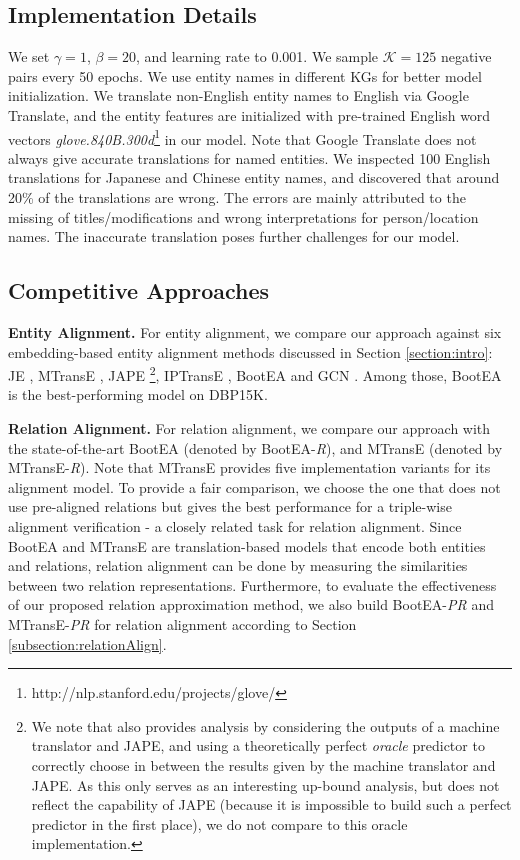 \documentclass[11pt,a4paper]{article}
\newcommand\cparagraph[1]{\vspace{1mm}\noindent\textbf{#1.}}
\begin{document}
\subsection{Implementation Details}
\label{implementation} We set $\gamma = 1$, $\beta = 20$, and learning rate to 0.001. We sample $\mathcal{K}=125$ negative pairs every 50
epochs.
We use entity names in different KGs for better model initialization. We translate non-English entity names to English via Google Translate, and the entity features are initialized with pre-trained English word vectors
\emph{glove.840B.300d}\footnote{http://nlp.stanford.edu/projects/glove/} in our model.
Note that Google Translate does not always give accurate translations for named entities. We inspected 100 English translations for Japanese and
Chinese entity names, and discovered that around 20\% of the translations are wrong. The errors are mainly attributed to the missing of
titles/modifications and wrong interpretations for person/location names. The inaccurate translation poses further challenges for our model.


\subsection{Competitive Approaches}

\cparagraph{Entity Alignment}
For entity alignment, we compare our approach against six embedding-based entity alignment methods discussed in
Section \ref{section:intro}: JE \cite{hao2016joint}, MTransE \cite{chen2016multilingual}, JAPE \cite{sun2017cross}\footnote{We note
	that \cite{sun2017cross} also provides analysis by considering the outputs of a machine translator and JAPE, and using a theoretically
	perfect \emph{oracle} predictor to correctly choose in between the results given by the machine translator and JAPE. As this only
	serves as an interesting up-bound analysis, but does not reflect the capability of JAPE (because it is impossible to build such a perfect predictor in the first place),
	we do not compare to this oracle implementation. },
IPTransE \cite{zhu2017iterative}, BootEA \cite{ijcai2018-611} and GCN \cite{D18-1032}. Among those, BootEA is the best-performing model on DBP15K.


\cparagraph{Relation Alignment}
For relation alignment, we compare our approach with the state-of-the-art BootEA (denoted by BootEA-\emph{R}), and MTransE (denoted by MTransE-\emph{R}).
Note that MTransE provides five implementation variants for its alignment model. To provide a fair comparison, we choose the one that does
not use pre-aligned relations but gives the best performance for a triple-wise alignment verification \cite{chen2016multilingual} - a
closely related task for relation alignment. Since BootEA and MTransE are translation-based models that encode both entities and
relations, relation alignment can be done by measuring the similarities between two relation representations. Furthermore, to evaluate the
effectiveness of our proposed relation approximation method, we also build BootEA-\emph{PR} and MTransE-\emph{PR} for relation alignment according
to Section \ref{subsection:relationAlign}. 	
\end{document}
